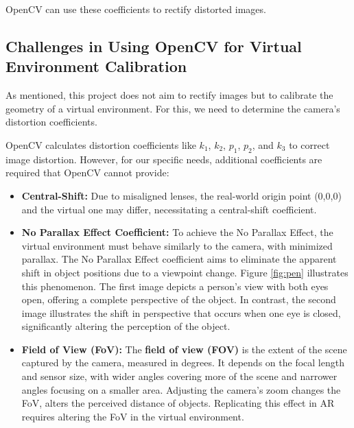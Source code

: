 \noindent OpenCV can use these coefficients to rectify distorted images.

\subsection{Challenges in Using OpenCV for Virtual Environment Calibration}

\noindent As mentioned, this project does not aim to rectify images but to calibrate the geometry of a virtual environment. For this, we need to determine the camera's distortion coefficients.

\noindent OpenCV calculates distortion coefficients like \( k_1 \), \( k_2 \), \( p_1 \), \( p_2 \), and \( k_3 \) to correct image distortion. However, for our specific needs, additional coefficients are required that OpenCV cannot provide:

\begin{itemize}
    \item \textbf{Central-Shift:} Due to misaligned lenses, the real-world origin point (0,0,0) and the virtual one may differ, necessitating a central-shift coefficient.
    \item \textbf{No Parallax Effect Coefficient:} To achieve the No Parallax Effect, the virtual environment must behave similarly to the camera, with minimized parallax. The No Parallax Effect coefficient aims to eliminate the apparent shift in object positions due to a viewpoint change. Figure \ref{fig:pen} illustrates this phenomenon. The first image depicts a person's view with both eyes open, offering a complete perspective of the object. In contrast, the second image illustrates the shift in perspective that occurs when one eye is closed, significantly altering the perception of the object.
    \item \textbf{Field of View (FoV):} The \textbf{field of view (FOV)} is the extent of the scene captured by the camera, measured in degrees. It depends on the focal length and sensor size, with wider angles covering more of the scene and narrower angles focusing on a smaller area. Adjusting the camera's zoom changes the FoV, alters the perceived distance of objects. Replicating this effect in \ac{AR} requires altering the FoV in the virtual environment.
\end{itemize}


